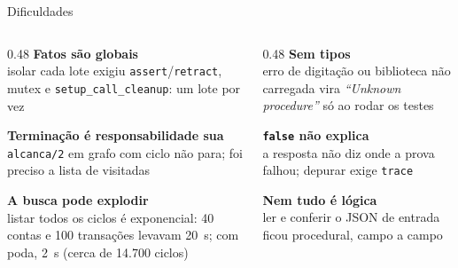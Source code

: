 \documentclass[aspectratio=169,11pt,xcolor=table]{beamer}
\begin{document}
\begin{frame}{Dificuldades}
  \begin{columns}[T]
    \begin{column}{0.48\textwidth}
      \small
      \textbf{\color{accent}Fatos são globais}\\
      isolar cada lote exigiu \texttt{assert}/\texttt{retract}, mutex e
      \texttt{setup\_call\_cleanup}: um lote por vez
      \vspace{7pt}

      \textbf{\color{accent}Terminação é responsabilidade sua}\\
      \texttt{alcanca/2} em grafo com ciclo não para; foi preciso a lista de
      visitadas
      \vspace{7pt}

      \textbf{\color{accent}A busca pode explodir}\\
      listar todos os ciclos é exponencial: 40 contas e 100 transações levavam
      20~s; com poda, 2~s (cerca de 14.700 ciclos)
    \end{column}
    \begin{column}{0.48\textwidth}
      \small
      \textbf{\color{accent}Sem tipos}\\
      erro de digitação ou biblioteca não carregada vira \emph{``Unknown
      procedure''} só ao rodar os testes
      \vspace{7pt}

      \textbf{\color{accent}\texttt{false} não explica}\\
      a resposta não diz onde a prova falhou; depurar exige \texttt{trace}
      \vspace{7pt}

      \textbf{\color{accent}Nem tudo é lógica}\\
      ler e conferir o JSON de entrada ficou procedural, campo a campo
    \end{column}
  \end{columns}
\end{frame}
\end{document}
